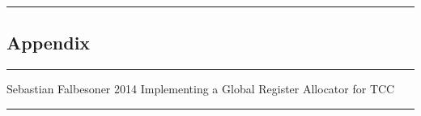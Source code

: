 \begin{center}\rule{0.5\linewidth}{0.5pt}\end{center}

\hypertarget{appendix-1}{%
\subsection{Appendix}\label{appendix-1}}

\begin{center}\rule{0.5\linewidth}{0.5pt}\end{center}

Sebastian Falbesoner 2014 Implementing a Global Register Allocator for
TCC

\begin{center}\rule{0.5\linewidth}{0.5pt}\end{center}
